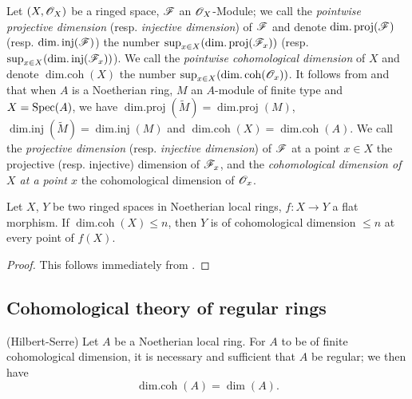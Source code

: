 \begin{env}[17.2.14]
\label{0.17.2.14}
Let $(X,\mathscr{O}_X)$ be a ringed space, $\mathscr{F}$ an $\mathscr{O}_X$-Module;
we call the \emph{pointwise projective dimension} (resp. \emph{injective dimension}) of $\mathscr{F}$ and denote $\operatorname{dim.proj}(\mathscr{F})$ (resp. $\operatorname{dim.inj}(\mathscr{F})$) the number $\sup_{x\in X}(\operatorname{dim.proj}(\mathscr{F}_x))$ (resp. $\sup_{x\in X}(\operatorname{dim.inj}(\mathscr{F}_x))$).
We call the \emph{pointwise cohomological dimension} of $X$ and denote $\operatorname{dim.coh}(X)$ the number $\sup_{x\in X}(\operatorname{dim.coh}(\mathscr{O}_x))$.
It follows from  and  that when $A$ is a Noetherian ring, $M$ an $A$-module of finite type and $X=\operatorname{Spec}(A)$, we have $\operatorname{dim.proj}(\widetilde{M})=\operatorname{dim.proj}(M)$, $\operatorname{dim.inj}(\widetilde{M})=\operatorname{dim.inj}(M)$ and $\operatorname{dim.coh}(X)=\operatorname{dim.coh}(A)$.
We call the \emph{projective dimension} (resp. \emph{injective dimension}) of $\mathscr{F}$ at a point $x\in X$ the projective (resp. injective) dimension of $\mathscr{F}_x$, and the \emph{cohomological dimension of $X$ at a point $x$} the cohomological dimension of $\mathscr{O}_x$.
\end{env}

\begin{proposition}[17.2.15]
\label{0.17.2.15}
Let $X$, $Y$ be two ringed spaces in Noetherian local rings, $f:X\to Y$ a flat morphism.
If $\operatorname{dim.coh}(X)\leq n$, then $Y$ is of cohomological dimension $\leq n$ at every point of $f(X)$.
\end{proposition}

\begin{proof}
This follows immediately from .
\end{proof}

\subsection{Cohomological theory of regular rings}
\label{subsection:0.17.3}

\begin{theorem}[17.3.1]
\label{0.17.3.1}
\textnormal{(Hilbert-Serre)}
Let $A$ be a Noetherian local ring.
For $A$ to be of finite cohomological dimension, it is necessary and sufficient that $A$ be regular; we then have
\[
\label{0.17.3.1.1}
  \operatorname{dim.coh}(A)=\dim(A).
  \tag{17.3.1.1}
\]
\end{theorem}

